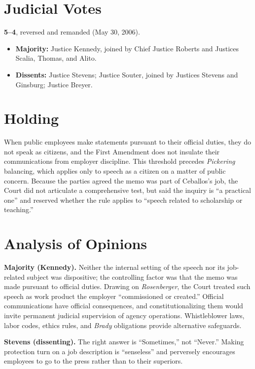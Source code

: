 \documentclass[12pt]{article}
\begin{document}
\section{Judicial Votes}

\textbf{5--4}, reversed and remanded (May 30, 2006).
\begin{itemize}
\item \textbf{Majority:} Justice Kennedy, joined by Chief Justice Roberts and Justices Scalia, Thomas, and Alito.
\item \textbf{Dissents:} Justice Stevens; Justice Souter, joined by Justices Stevens and Ginsburg; Justice Breyer.
\end{itemize}

\section{Holding}

When public employees make statements pursuant to their official duties, they do not speak as citizens, and the First Amendment does not insulate their communications from employer discipline. This threshold precedes \textit{Pickering} balancing, which applies only to speech as a citizen on a matter of public concern. Because the parties agreed the memo was part of Ceballos's job, the Court did not articulate a comprehensive test, but said the inquiry is ``a practical one'' and reserved whether the rule applies to ``speech related to scholarship or teaching.''

\section{Analysis of Opinions}

\textbf{Majority (Kennedy).} Neither the internal setting of the speech nor its job-related subject was dispositive; the controlling factor was that the memo was made pursuant to official duties. Drawing on \textit{Rosenberger}, the Court treated such speech as work product the employer ``commissioned or created.'' Official communications have official consequences, and constitutionalizing them would invite permanent judicial supervision of agency operations. Whistleblower laws, labor codes, ethics rules, and \textit{Brady} obligations provide alternative safeguards.

\textbf{Stevens (dissenting).} The right answer is ``Sometimes,'' not ``Never.'' Making protection turn on a job description is ``senseless'' and perversely encourages employees to go to the press rather than to their superiors.
\end{document}
